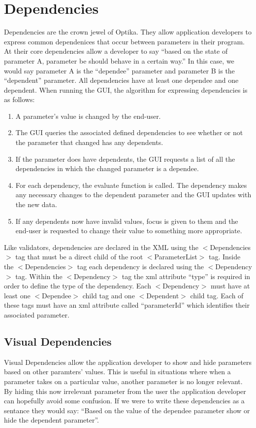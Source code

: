 \section{Dependencies}
Dependencies are the crown jewel of Optika. They allow application developers to express common dependenices that occur between
parameters in their program. At their core dependencies allow a developer to say ``based on the state of parameter A, parameter be should
behave in a certain way.'' In this case, we would say parameter A is the ``dependee'' parameter and parameter B is the ``dependent'' parameter.
All dependencies have at least one dependee and one dependent. When running the GUI, the algorithm for expressing dependencies is as follows:
\begin{enumerate}
	\item A parameter's value is changed by the end-user.
	\item The GUI queries the associated defined dependencies to see whether or not the parameter that changed has any dependents.
	\item If the parameter does have dependents, the GUI requests a list of all the dependencies in which the changed
	parameter is a dependee.
	\item For each dependency, the evaluate function is called. The dependency makes any necessary changes to the dependent parameter
	and the GUI updates with the new data.
	\item If any dependents now have invalid values, focus is given to them and the end-user is requested to change their value to
	something more appropriate.
\end{enumerate}
Like validators, dependencies are declared in the XML using the $<$Dependencies$>$ tag that must be a direct child
of the root $<$ParameterList$>$ tag. Inside the $<$Dependencies$>$ tag each dependency is declared using the $<$Dependency$>$ tag. Within the
$<$Dependency$>$ tag the xml attribute ``type'' is required in order to define the type of the dependency. Each $<$Dependency$>$ must have at least
one $<$Dependee$>$ child tag and one $<$Dependent$>$ child tag. Each of these tags must have an xml attribute called ``parameterId'' which identifies
their associated parameter.

\subsection{Visual Dependencies}
Visual Dependencies allow the application developer to show and hide parameters based on other paramters' values. This is useful in situations where
when a parameter takes on a particular value, another parameter is no longer relevant. By hiding this now irrelevant parameter from the user the
application developer can hopefully avoid some confusion. If we were to write these dependencies as a sentance they would say: ``Based on
the value of the dependee parameter show or hide the dependent parameter''.

